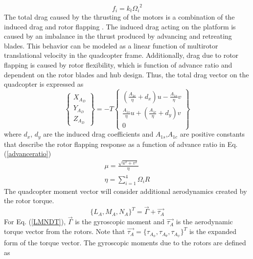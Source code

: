\begin{equation}
f_{i} = k_{t}{\Omega_{i}}^{2}
\label{fi}
\end{equation}
The total drag caused by the thrusting of the motors is a combination of the induced drag and rotor flapping \cite{quadfdnc}. The induced drag acting on the platform is caused by an imbalance in the thrust produced by advancing and retreating blades. This behavior can be modeled as a linear function of multirotor translational velocity in the quadcopter frame. Additionally, drag due to rotor flapping is caused by rotor flexibility, which is function of advance ratio and dependent on the rotor blades and hub design\cite{rotorflap}. Thus, the total drag vector on the quadcopter is expressed as
\begin{equation}
\begin{Bmatrix}
X_{A_{D}} \\ Y_{A_{D}} \\ Z_{A_{D}}
\end{Bmatrix} = -T\begin{Bmatrix}
\left(\frac{A_{1c}}{\eta} + d_{x}\right)u - \frac{A_{1s}}{\eta}v \\
\frac{A_{1s}}{\eta}u + \left(\frac{A_{1c}}{\eta}  + d_{y}\right)v \\ 0
\end{Bmatrix}
\label{DAxyz}
\end{equation}
where $d_{x}$, $d_{y}$ are the induced drag coefficients and $A_{1s}$,$A_{1c}$ are positive constants that describe the rotor flapping response as a function of advance ratio in Eq. (\ref{advanceratio})
\begin{equation}
\begin{split}
\mu = \frac{\sqrt{u^2 + v^2}}{\eta}\\
\eta = {\sum\limits_{i=1}^4 \Omega_{i}R}
\label{advanceratio}
\end{split}
\end{equation}
The quadcopter moment vector will consider additional aerodynamics created by the rotor torque.
\begin{equation}
\{L_A,M_A,N_A\}^{T}=  \overrightarrow{\Gamma} + \overrightarrow{\tau_{A}}
\label{LMNDT}
\end{equation}
For Eq. (\ref{LMNDT}),  $\overrightarrow{\Gamma}$ is the gyroscopic moment and $\overrightarrow{\tau_{A}}$ is the aerodynamic torque vector from the rotors. Note that $\overrightarrow{\tau_{A}}=\{\tau_{A_{\phi}},\tau_{A_{\theta}},\tau_{A_{\psi}}\}^{T}$ is the expanded form of the torque vector. The gyroscopic moments due to the rotors are defined as
